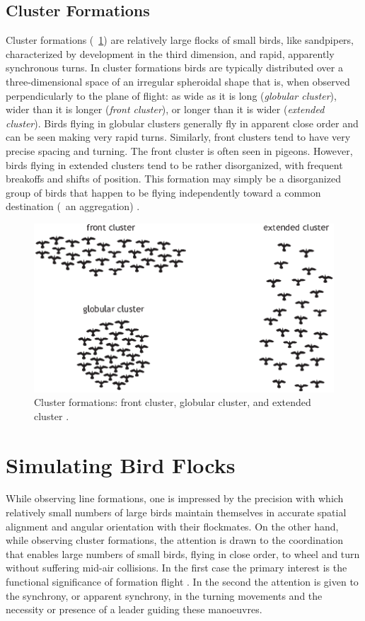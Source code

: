 \subsection{Cluster Formations}
Cluster formations (\fig~\ref{fig:clusterFormations}) are relatively large flocks of small birds, like sandpipers, characterized by development in the third di\-men\-si\-on, and rapid, apparently syn\-chro\-nous turns. In cluster formations birds are typically distributed over a three-di\-men\-si\-onal space of an irregular spheroidal shape that is, when observed perpendicularly to the plane of flight: as wide as it is long ({\em globular cluster\/}), wider than it is longer ({\em front cluster\/}), or longer than it is wider ({\em extended cluster\/}). Birds flying in globular clusters generally fly in apparent close order and can be seen making very rapid turns. Similarly, front clusters tend to have very precise spacing and turning. The front cluster is often seen in pigeons. However, birds flying in extended clusters tend to be rather disorganized, with frequent breakoffs and shifts of position. This formation may simply be a disorganized group of birds that happen to be flying independently toward a common destination (\ie\ an aggregation) \cite{heppner:1974a}.

\begin{figure}%
\includegraphics{fig[clusterFormations].pdf}
\caption{Cluster formations: front cluster, globular cluster, and extended cluster \cite{heppner:1974a}.}
\label{fig:clusterFormations}
\end{figure}


\section{Simulating Bird Flocks}
While observing line formations, one is impressed by the precision with which relatively small numbers of large birds maintain themselves in accurate spatial alignment and angular orientation with their flockmates. On the other hand, while observing cluster formations, the attention is drawn to the coordination that enables large numbers of small birds, flying in close order, to wheel and turn without suffering mid-air collisions. In the first case the primary interest is the functional significance of formation flight \cite{heppner:1997,speakman:1998}. In the second the attention is given to the synchrony, or apparent synchrony, in the turning movements and the necessity or presence of a leader guiding these manoeuvres.

